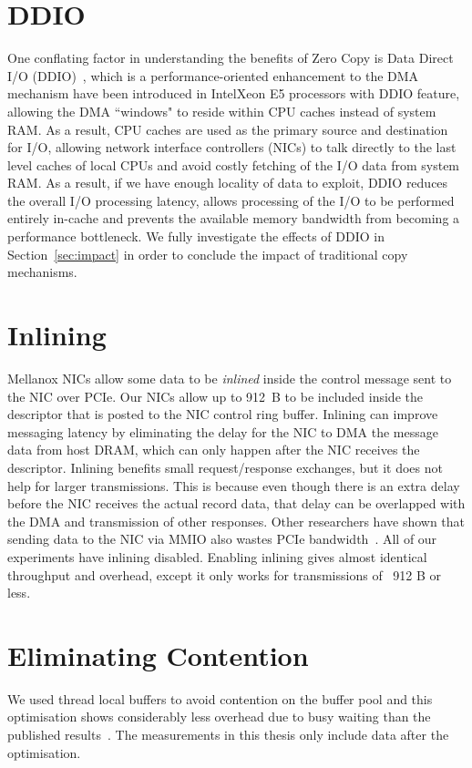 \section{DDIO}
One conflating factor in understanding the benefits of Zero Copy is Data Direct I/O (DDIO)~\cite{ddio}, which is a performance-oriented enhancement 
to the DMA mechanism have been introduced in Intel\textregistered Xeon E5 processors with DDIO feature,
allowing the DMA ``windows" to reside within CPU caches instead of system RAM. As a result,
CPU caches are used as the primary source and destination for I/O, 
allowing network interface controllers (NICs) to talk directly to the last level caches of local CPUs
and avoid costly fetching of the I/O data from system RAM. As a result, if we have enough locality of data to exploit,
DDIO reduces the overall I/O processing latency, allows processing of the I/O 
to be performed entirely in-cache and prevents the available memory bandwidth from becoming a performance bottleneck.
We fully investigate the effects of DDIO in Section~\ref{sec:impact} in order to conclude the impact of 
traditional copy mechanisms.


\section{Inlining}
Mellanox NICs allow some data to be {\em inlined} inside the control message
sent to the NIC over PCIe. Our NICs allow up to 912~B to be included inside the
descriptor that is posted to the NIC control ring buffer.  Inlining can improve
messaging latency by eliminating the delay for the NIC to DMA the message data
from host DRAM, which can only happen after the NIC receives the descriptor.
Inlining benefits small request/response exchanges, but it does not help for
larger transmissions. This is because even though there is an extra delay
before the NIC receives the actual record data, that delay can be overlapped
with the DMA and transmission of other responses. Other researchers have shown
that sending data to the NIC via MMIO also wastes PCIe bandwidth~\cite{rdma}.
All of our experiments have inlining disabled. Enabling inlining gives almost identical throughput and overhead, except it only
works for transmissions of ~912 B or less.

\section{Eliminating Contention}
We used thread local buffers to avoid contention on the buffer pool and this optimisation shows considerably less 
overhead due to busy waiting than the published results~\cite{imdmpaper}. The measurements in this thesis only include
data after the optimisation.

